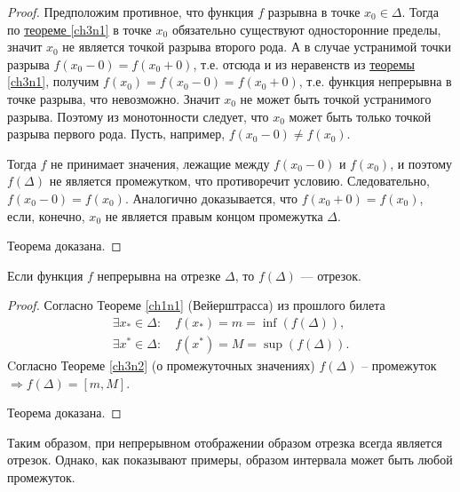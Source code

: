 \begin{proof}
Предположим противное, что функция $f$ разрывна в точке $x_0 \in\Delta$. Тогда по \hyperref[ch3n1]{теореме \ref{ch3n1}} в точке $x_0$ обязательно существуют односторонние пределы, значит $x_0$ не является точкой разрыва второго рода.  А в случае устранимой точки разрыва $f(x_0-0)=f(x_0+0)$, т.е. отсюда и из неравенств из   \hyperref[ch3n1]{теоремы \ref{ch3n1}}, получим $f(x_0)=f(x_0-0)=f(x_0+0)$, т.е. функция непрерывна в точке разрыва, что невозможно. Значит $x_0$ не может быть точкой устранимого разрыва. Поэтому из монотонности следует, что $x_0$ может быть только точкой разрыва первого рода. Пусть, например, $f(x_0-0)\ne f(x_0)$.

Тогда $f$ не принимает значения, лежащие между $f(x_0 - 0)$ и $f(x_0)$, и поэтому $f(\Delta)$ не является промежутком, что противоречит условию. Следовательно, $f(x_0-0) = f(x_0)$. Аналогично доказывается, что  $f(x_0 + 0) = f(x_0)$, если, конечно, $x_0$ не является правым концом промежутка $\Delta$. 

\noindent
Теорема доказана.
\end{proof} 

\begin{thm}
Если функция $f$ непрерывна на отрезке $\Delta$, то $f(\Delta)$ — отрезок.
\end{thm}
\begin{proof}
Согласно Теореме \ref{ch1n1} (Вейерштрасса) из прошлого билета 
\begin{gather*}
\exists x_* \in \Delta:\quad f(x_*)=m=\inf(f(\Delta)),\\
\exists x^* \in \Delta:\quad f(x^*)=M=\sup(f(\Delta)).
\end{gather*}   
Cогласно Теореме \ref{ch3n2} (о промежуточных значениях) $f(\Delta)$ -- промежуток $\Rightarrow f(\Delta)=[m,M]$. 

\noindent
Теорема доказана.
\end{proof} 

Таким образом, при непрерывном отображении образом отрезка всегда является отрезок. Однако, как показывают примеры, образом интервала может быть любой промежуток.
